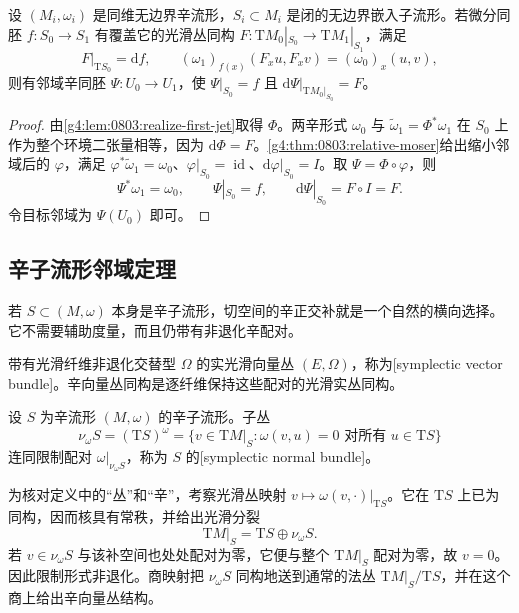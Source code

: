 \begin{corollary}\label{g4:cor:0803:symplectic-first-jet}
	设 \((M_i,\omega_i)\) 是同维无边界辛流形，\(S_i\subset M_i\) 是闭的无边界嵌入子流形。若微分同胚 \(f:S_0\to S_1\) 有覆盖它的光滑丛同构 \(F:\mathrm{T}M_0|_{S_0}\to\mathrm{T}M_1|_{S_1}\)，满足
	\[
		F|_{\mathrm{T}S_0}=\mathrm{d}f,
		\qquad (\omega_1)_{f(x)}(F_xu,F_xv)=(\omega_0)_x(u,v),
	\]
	则有邻域辛同胚 \(\Psi:U_0\to U_1\)，使 \(\Psi|_{S_0}=f\) 且 \(\mathrm{d}\Psi|_{\mathrm{T}M_0|_{S_0}}=F\)。
\end{corollary}
\begin{proof}
	由\cref{g4:lem:0803:realize-first-jet}取得 \(\Phi\)。两辛形式 \(\omega_0\) 与 \(\widetilde\omega_1=\Phi^*\omega_1\) 在 \(S_0\) 上作为整个环境二张量相等，因为 \(\mathrm{d}\Phi=F\)。\cref{g4:thm:0803:relative-moser}给出缩小邻域后的 \(\varphi\)，满足 \(\varphi^*\widetilde\omega_1=\omega_0\)、\(\varphi|_{S_0}=\operatorname{id}\)、\(\mathrm{d}\varphi|_{S_0}=I\)。取 \(\Psi=\Phi\circ\varphi\)，则
	\[
		\Psi^*\omega_1=\omega_0,\qquad
		\Psi|_{S_0}=f,\qquad
		\mathrm{d}\Psi|_{S_0}=F\circ I=F.
	\]
	令目标邻域为 \(\Psi(U_0)\) 即可。
\end{proof}

\subsection{辛子流形邻域定理}
\label{g4:subsec:0803:03}

若 \(S\subset(M,\omega)\) 本身是辛子流形，切空间的辛正交补就是一个自然的横向选择。它不需要辅助度量，而且仍带有非退化辛配对。

\begin{definition}\label{g4:def:0803:symplectic-normal}
	带有光滑纤维非退化交替型 \(\Omega\) 的实光滑向量丛 \((E,\Omega)\)，称为[symplectic vector bundle]。辛向量丛同构是逐纤维保持这些配对的光滑实丛同构。

	设 \(S\) 为辛流形 \((M,\omega)\) 的辛子流形。子丛
	\[
		\nu_\omega S=(\mathrm{T}S)^\omega
		=\{v\in\mathrm{T}M|_S:\omega(v,u)=0\text{ 对所有 }u\in\mathrm{T}S\}
	\]
	连同限制配对 \(\omega|_{\nu_\omega S}\)，称为 \(S\) 的[symplectic normal bundle]。
\end{definition}

为核对定义中的“丛”和“辛”，考察光滑丛映射 \(v\mapsto\omega(v,\cdot)|_{\mathrm{T}S}\)。它在 \(\mathrm{T}S\) 上已为同构，因而核具有常秩，并给出光滑分裂
\begin{equation}\label{g4:eq:0803:symplectic-normal-splitting}
	\mathrm{T}M|_S=\mathrm{T}S\oplus\nu_\omega S.
\end{equation}
若 \(v\in\nu_\omega S\) 与该补空间也处处配对为零，它便与整个 \(\mathrm{T}M|_S\) 配对为零，故 \(v=0\)。因此限制形式非退化。商映射把 \(\nu_\omega S\) 同构地送到通常的法丛 \(\mathrm{T}M|_S/\mathrm{T}S\)，并在这个商上给出辛向量丛结构。

